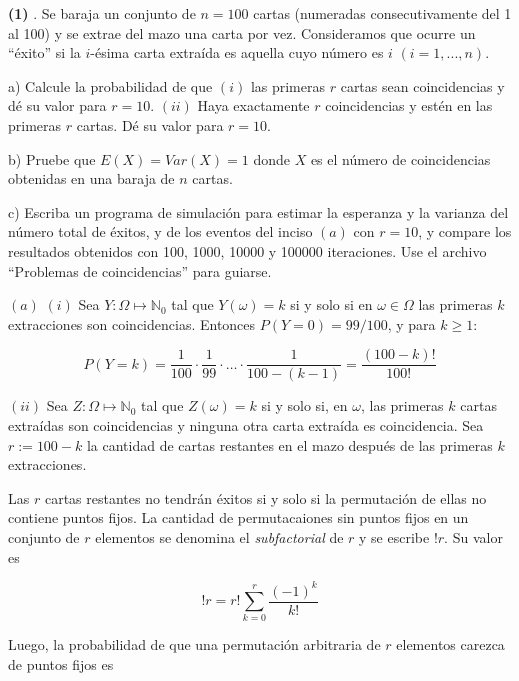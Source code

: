 \documentclass[a4paper, 12pt]{article}
\begin{document}
\begin{myframe}
  \textbf{(1)} . Se baraja un conjunto de $n = 100$ cartas (numeradas
  consecutivamente del 1 al 100) y se extrae del mazo una carta por vez.
  Consideramos que ocurre un “éxito” si la $i$-ésima carta extraída es aquella
  cuyo número es $i$ $(i = 1,...,n)$. 

  a) Calcule la probabilidad de que $(i)$ las
  primeras $r$ cartas sean coincidencias y dé su valor para $r = 10$. $(ii)$ Haya
  exactamente $r$ coincidencias y estén en las primeras $r$ cartas. Dé su valor para
  $r = 10$. 

  b) Pruebe que $E(X) = Var(X) = 1$ donde $X$ es el número de coincidencias
  obtenidas en una baraja de $n$ cartas. 

  c) Escriba un programa de simulación para
  estimar la esperanza y la varianza del número total de éxitos, y de los
  eventos del inciso $(a)$ con $r = 10$, y compare los resultados obtenidos con 100,
  1000, 10000 y 100000 iteraciones. Use el archivo “Problemas de coincidencias”
  para guiarse.
\end{myframe}


$(a)$ $(i)$ Sea $Y : \Omega \mapsto \mathbb{N}_0$ tal que $Y(\omega) = k$ si y solo si en
$\omega \in \Omega$ las primeras $k$ extracciones son coincidencias. Entonces
$P(Y = 0) = 99 / 100$, y para $k \geq 1$:

\begin{equation*}
  P(Y = k) = \frac{1}{100} \cdot \frac{1}{99} \cdot \ldots \cdot \frac{1}{100
  - (k-1)} = \frac{(100 - k)!}{100!}
\end{equation*}

$(ii)$ Sea $Z : \Omega \mapsto \mathbb{N}_0$ tal que $Z(\omega) = k$ si y solo si,
en $\omega$, las primeras $k$ cartas extraídas son coincidencias y ninguna otra
carta extraída es coincidencia.  Sea $r := 100 - k$ la cantidad de cartas
restantes en el mazo después de las primeras $k$ extracciones.

Las $r$ cartas restantes no tendrán éxitos si y solo si la permutación de ellas
no contiene puntos fijos. La cantidad de permutacaiones sin puntos fijos en un
conjunto de $r$ elementos se denomina el \textit{subfactorial} de $r$ y se
escribe $!r$. Su valor es 

\begin{equation*}
  !r = r! \sum_{k=0}^r \frac{(-1)^k}{k!}
\end{equation*}

Luego, la probabilidad de que una permutación arbitraria de $r$ elementos
carezca de puntos fijos es 
\end{document}
